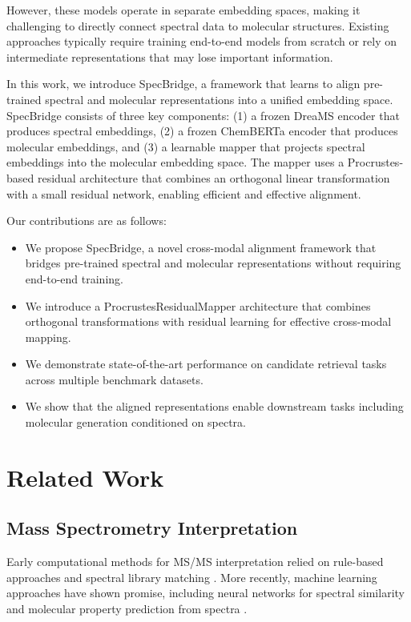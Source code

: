 \documentclass[11pt]{article}
\begin{document}
However, these models operate in separate embedding spaces, making it challenging to directly connect spectral data to molecular structures. Existing approaches typically require training end-to-end models from scratch or rely on intermediate representations that may lose important information.

In this work, we introduce SpecBridge, a framework that learns to align pre-trained spectral and molecular representations into a unified embedding space. SpecBridge consists of three key components: (1) a frozen DreaMS encoder that produces spectral embeddings, (2) a frozen ChemBERTa encoder that produces molecular embeddings, and (3) a learnable mapper that projects spectral embeddings into the molecular embedding space. The mapper uses a Procrustes-based residual architecture that combines an orthogonal linear transformation with a small residual network, enabling efficient and effective alignment.

Our contributions are as follows:
\begin{itemize}
    \item We propose SpecBridge, a novel cross-modal alignment framework that bridges pre-trained spectral and molecular representations without requiring end-to-end training.
    \item We introduce a ProcrustesResidualMapper architecture that combines orthogonal transformations with residual learning for effective cross-modal mapping.
    \item We demonstrate state-of-the-art performance on candidate retrieval tasks across multiple benchmark datasets.
    \item We show that the aligned representations enable downstream tasks including molecular generation conditioned on spectra.
\end{itemize}

\section{Related Work}

\subsection{Mass Spectrometry Interpretation}

Early computational methods for MS/MS interpretation relied on rule-based approaches and spectral library matching \cite{stein1994optimization}. More recently, machine learning approaches have shown promise, including neural networks for spectral similarity \cite{wang2014massive} and molecular property prediction from spectra \cite{wei2019retrieving}.
\end{document}
